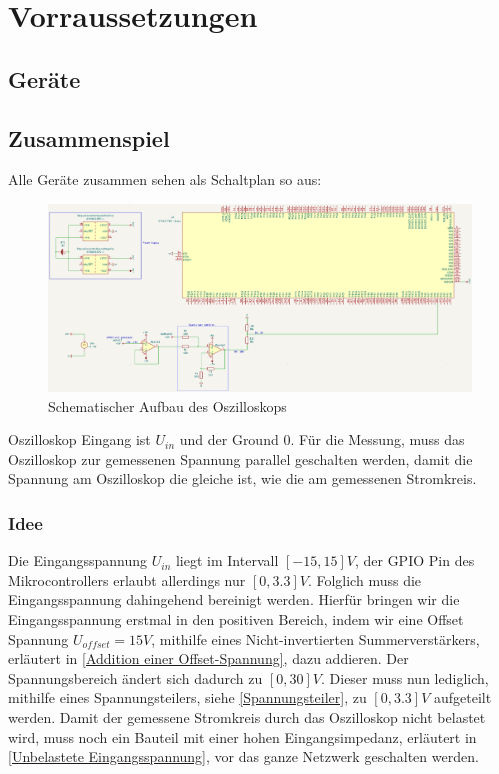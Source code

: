 \section{Vorraussetzungen}
\label{Vorraussetzungen}


\subsection{Geräte}




\subsection{Zusammenspiel}

Alle Geräte zusammen sehen als Schaltplan so aus:
\begin{figure}[h]
	\centering
	\includegraphics[width=\textwidth, scale=0.5]{images/schematic_opamps2.png}
	\caption{Schematischer Aufbau des Oszilloskops}
\end{figure}


Oszilloskop Eingang ist $U_{in}$ und der Ground $0$. \newline
Für die Messung, muss das Oszilloskop zur gemessenen Spannung parallel geschalten werden,
damit die Spannung am Oszilloskop die gleiche ist, wie die am gemessenen Stromkreis.

\subsubsection{Idee}
Die Eingangsspannung $U_{in}$ liegt im Intervall $[-15, 15] V$,
der GPIO Pin des Mikrocontrollers erlaubt allerdings nur $[0, 3.3] V$. \newline
Folglich muss die Eingangsspannung dahingehend bereinigt werden.
\newline \newline
Hierfür bringen wir die Eingangsspannung erstmal in den positiven Bereich, indem wir
eine Offset Spannung $U_{offset} = 15V$, mithilfe eines Nicht-invertierten Summerverstärkers, erläutert in \ref{Addition einer Offset-Spannung}, dazu addieren. \newline
Der Spannungsbereich ändert sich dadurch zu $[0, 30] V$.
Dieser muss nun lediglich, mithilfe eines Spannungsteilers, siehe \ref{Spannungsteiler}, zu $[0, 3.3] V$ aufgeteilt werden.
Damit der gemessene Stromkreis durch das Oszilloskop nicht belastet wird, muss noch ein Bauteil mit einer hohen Eingangsimpedanz, erläutert in \ref{Unbelastete Eingangsspannung}, vor das ganze Netzwerk geschalten werden.


